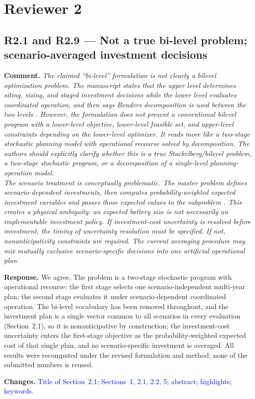 \documentclass[11pt]{article}
\newcommand{\rcomment}[1]{\par\medskip\noindent\textbf{Comment.} \textit{#1}\par\smallskip}
\newcommand{\rresponse}[1]{\noindent\textbf{Response.} #1\par\smallskip}
\newcommand{\rchanges}[1]{\noindent\textbf{Changes.} \textcolor{blue}{#1}\par\medskip}
\begin{document}
\section*{Reviewer 2}

\subsection*{R2.1 and R2.9 --- Not a true bi-level problem; scenario-averaged investment decisions}
\rcomment{
The claimed ``bi-level'' formulation is not clearly a bilevel optimization problem. The manuscript states that the upper level determines siting, sizing, and staged investment decisions while the lower level evaluates coordinated operation, and then says Benders decomposition is used between the two levels . However, the formulation does not present a conventional bilevel program with a lower-level objective, lower-level feasible set, and upper-level constraints depending on the lower-level optimizer. It reads more like a two-stage stochastic planning model with operational recourse solved by decomposition. The authors should explicitly clarify whether this is a true Stackelberg/bilevel problem, a two-stage stochastic program, or a decomposition of a single-level planning-operation model.\\
The scenario treatment is conceptually problematic. The master problem defines scenario-dependent investments, then computes probability-weighted expected investment variables and passes those expected values to the subproblem . This creates a physical ambiguity: an expected battery size is not necessarily an implementable investment policy. If investment-cost uncertainty is resolved before investment, the timing of uncertainty resolution must be specified. If not, nonanticipativity constraints are required. The current averaging procedure may mix mutually exclusive scenario-specific decisions into one artificial operational plan.
}
\rresponse{We agree. The problem is a two-stage stochastic program with operational recourse: the first
stage selects one scenario-independent multi-year plan; the second stage evaluates it under
scenario-dependent coordinated operation. The bi-level vocabulary has been removed throughout, and the
investment plan is a single vector common to all scenarios in every evaluation (Section~2.1), so it is
nonanticipative by construction; the investment-cost uncertainty enters the first-stage objective as the
probability-weighted expected cost of that single plan, and no scenario-specific investment is averaged.
All results were recomputed under the revised formulation and method; none of the submitted numbers is
reused.}
\rchanges{Title of Section~2.1; Sections~1, 2.1, 2.2, 5; abstract; highlights; keywords.}
\end{document}
